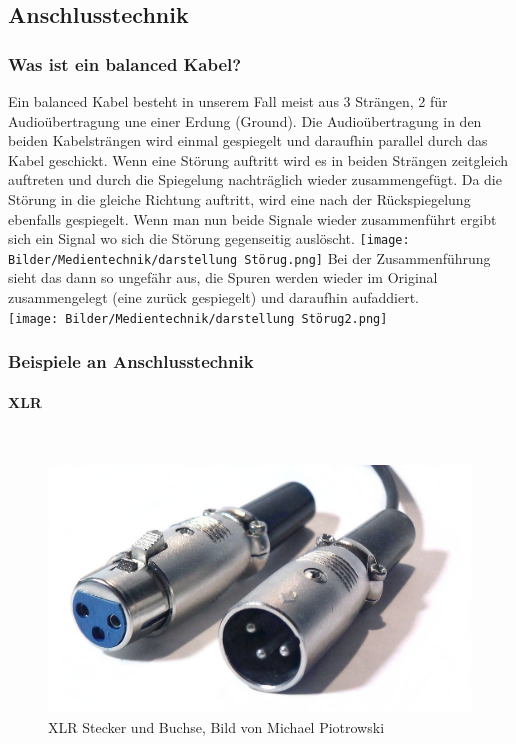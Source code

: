 \subsection{Anschlusstechnik}

\subsubsection{Was ist ein balanced Kabel?}
Ein balanced Kabel besteht in unserem Fall meist aus 3 Strängen, 2 für Audioübertragung une einer Erdung (Ground). Die Audioübertragung in den beiden Kabelsträngen wird einmal gespiegelt und daraufhin parallel durch das Kabel geschickt. Wenn eine Störung auftritt wird es in beiden Strängen zeitgleich auftreten und durch die Spiegelung nachträglich wieder zusammengefügt. Da die Störung in die gleiche Richtung auftritt, wird  eine nach der Rückspiegelung ebenfalls gespiegelt. Wenn man nun beide Signale wieder zusammenführt ergibt sich ein Signal wo sich die Störung gegenseitig auslöscht.
\texttt{[image: Bilder/Medientechnik/darstellung Störug.png]}\newpage
Bei der Zusammenführung sieht das dann so ungefähr aus, die Spuren werden wieder im Original zusammengelegt (eine zurück gespiegelt) und daraufhin aufaddiert. \\
\texttt{[image: Bilder/Medientechnik/darstellung Störug2.png]}

\subsubsection{Beispiele an Anschlusstechnik}
\paragraph{XLR}
~
\begin{figure}[h]
    \centering
    \includegraphics[width=1\textwidth]{Bilder/Medientechnik/Xlr-connectors.jpg}
    \caption{XLR Stecker und Buchse, Bild von Michael Piotrowski\cite{Xlrconne26:online}}
    \label{fig:XLR Stecker \& Buchse}
\end{figure}

